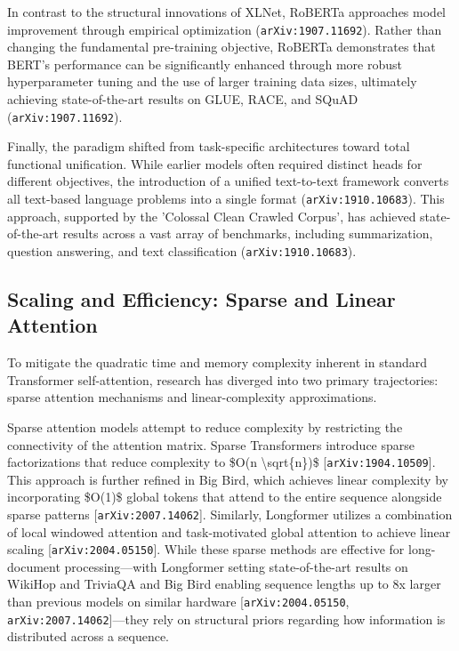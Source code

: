 \documentclass[11pt]{article}
\begin{document}
In contrast to the structural innovations of XLNet, RoBERTa approaches model improvement through empirical optimization (\texttt{arXiv:1907.11692}). Rather than changing the fundamental pre-training objective, RoBERTa demonstrates that BERT's performance can be significantly enhanced through more robust hyperparameter tuning and the use of larger training data sizes, ultimately achieving state-of-the-art results on GLUE, RACE, and SQuAD (\texttt{arXiv:1907.11692}).

Finally, the paradigm shifted from task-specific architectures toward total functional unification. While earlier models often required distinct heads for different objectives, the introduction of a unified text-to-text framework converts all text-based language problems into a single format (\texttt{arXiv:1910.10683}). This approach, supported by the 'Colossal Clean Crawled Corpus', has achieved state-of-the-art results across a vast array of benchmarks, including summarization, question answering, and text classification (\texttt{arXiv:1910.10683}).

\subsection{Scaling and Efficiency: Sparse and Linear Attention}

To mitigate the quadratic time and memory complexity inherent in standard Transformer self-attention, research has diverged into two primary trajectories: sparse attention mechanisms and linear-complexity approximations.

Sparse attention models attempt to reduce complexity by restricting the connectivity of the attention matrix. Sparse Transformers introduce sparse factorizations that reduce complexity to \$O(n \textbackslash{}sqrt\{n\})\$ [\texttt{arXiv:1904.10509}]. This approach is further refined in Big Bird, which achieves linear complexity by incorporating \$O(1)\$ global tokens that attend to the entire sequence alongside sparse patterns [\texttt{arXiv:2007.14062}]. Similarly, Longformer utilizes a combination of local windowed attention and task-motivated global attention to achieve linear scaling [\texttt{arXiv:2004.05150}]. While these sparse methods are effective for long-document processing—with Longformer setting state-of-the-art results on WikiHop and TriviaQA and Big Bird enabling sequence lengths up to 8x larger than previous models on similar hardware [\texttt{arXiv:2004.05150}, \texttt{arXiv:2007.14062}]—they rely on structural priors regarding how information is distributed across a sequence.
\end{document}
